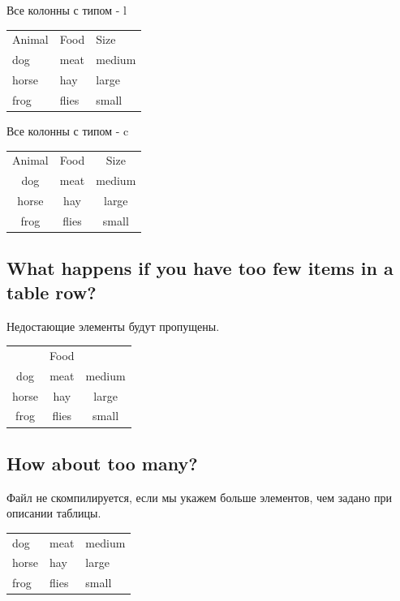 \documentclass{article}
\begin{document}
  Все колонны с типом - l
     \smallskip
     \begin{tabular}{lll}
    Animal & Food & Size \\
    dog & meat & medium \\
    horse & hay & large \\
    frog & flies & small \\
  \end{tabular}


    Все колонны с типом - c
     \smallskip

     \begin{tabular}{ccc}
    Animal & Food & Size \\
    dog & meat & medium \\
    horse & hay & large \\
    frog & flies & small \\
  \end{tabular}

   \smallskip


  \subsection{What happens if you have too few items in a table row?}
  \label{subsec:width}


  Недостающие элементы будут пропущены.
  \smallskip


  \begin{tabular}{ccc}
     & Food \\
    dog & meat & medium \\
    horse & hay & large \\
    frog & flies & small \\
  \end{tabular}


  \subsection{How about too many?}
  \label{subsec:width}


  Файл не скомпилируется, если мы укажем больше элементов, чем задано при описании таблицы.
      
  \begin{tabular}{lll}
    dog & meat & medium \\
    horse & hay & large \\
    frog & flies & small \\
  \end{tabular}
\end{document}
